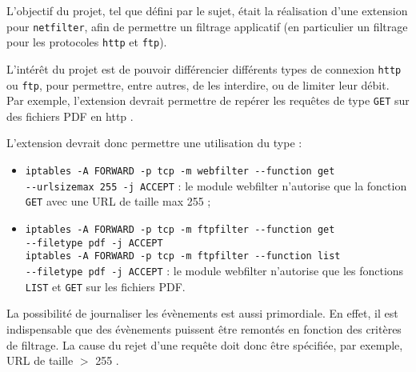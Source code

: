 L'objectif du projet, tel que défini par le sujet, était la réalisation d'une extension
pour \verb+netfilter+, afin de permettre un filtrage applicatif (en particulier un filtrage
pour les protocoles \verb+http+ et \verb+ftp+).

L'intérêt du projet est de pouvoir différencier différents types de connexion \verb+http+ ou \verb+ftp+,
pour permettre, entre autres, de les interdire, ou de limiter leur débit. Par exemple, l'extension
devrait permettre de repérer \og les requêtes de type \verb+GET+ sur des fichiers PDF en http \fg{}.

L'extension devrait donc permettre une utilisation du type :
\begin{itemize}
\item \verb+iptables -A FORWARD -p tcp -m webfilter --function get+\\ \verb+--urlsizemax 255 -j ACCEPT+ : le module \og webfilter \fg{} n'autorise que la fonction \verb+GET+ avec une URL de taille max 255 ;
\item \verb+iptables -A FORWARD -p tcp -m ftpfilter --function get+\\
\verb+--filetype pdf -j ACCEPT+\\
\verb+iptables -A FORWARD -p tcp -m ftpfilter --function list+\\
\verb+--filetype pdf -j ACCEPT+ : le module \og webfilter \fg{} n'autorise que les fonctions \verb+LIST+ et \verb+GET+ sur les fichiers PDF.
\end{itemize}

La possibilité de journaliser les évènements est aussi primordiale. En effet, il est indispensable que des évènements puissent être remontés en fonction des critères de filtrage. La cause du rejet d'une requête doit donc être spécifiée, par exemple, \og URL de taille $>$ 255 \fg{}.
